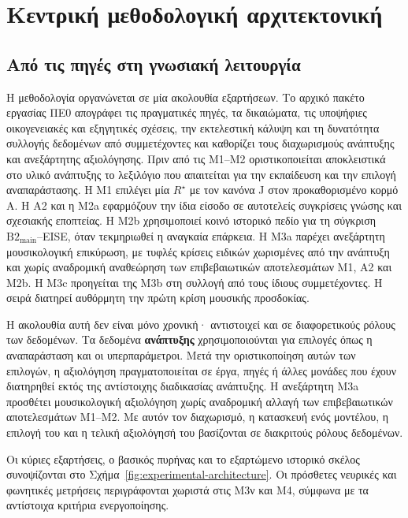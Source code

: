 \documentclass[11pt,a4paper]{article}
\begin{document}
\section{Κεντρική μεθοδολογική αρχιτεκτονική}

\subsection{Από τις πηγές στη γνωσιακή λειτουργία}

Η μεθοδολογία οργανώνεται σε μία ακολουθία εξαρτήσεων. Το αρχικό πακέτο εργασίας ΠΕ0 απογράφει τις πραγματικές πηγές, τα δικαιώματα, τις υποψήφιες οικογενειακές και εξηγητικές σχέσεις, την εκτελεστική κάλυψη και τη δυνατότητα συλλογής δεδομένων από συμμετέχοντες και καθορίζει τους διαχωρισμούς ανάπτυξης και ανεξάρτητης αξιολόγησης. Πριν από τις M1--M2 οριστικοποιείται αποκλειστικά στο υλικό ανάπτυξης το λεξιλόγιο που απαιτείται για την εκπαίδευση και την επιλογή αναπαράστασης. Η Μ1 επιλέγει μία $R^\star$ με τον κανόνα J στον προκαθορισμένο κορμό A. Η Α2 και η Μ2a εφαρμόζουν την ίδια είσοδο σε αυτοτελείς συγκρίσεις γνώσης και σχεσιακής εποπτείας. Η Μ2b χρησιμοποιεί κοινό ιστορικό πεδίο για τη σύγκριση $\mathrm{B2}_{\mathrm{main}}$--EISE, όταν τεκμηριωθεί η αναγκαία επάρκεια. Η M3a παρέχει ανεξάρτητη μουσικολογική επικύρωση, με τυφλές κρίσεις ειδικών χωρισμένες από την ανάπτυξη και χωρίς αναδρομική αναθεώρηση των επιβεβαιωτικών αποτελεσμάτων M1, Α2 και Μ2b. Η M3c προηγείται της M3b στη συλλογή από τους ίδιους συμμετέχοντες. Η σειρά διατηρεί αυθόρμητη την πρώτη κρίση μουσικής προσδοκίας.

Η ακολουθία αυτή δεν είναι μόνο χρονική· αντιστοιχεί και σε διαφορετικούς ρόλους των δεδομένων. Τα δεδομένα \textbf{ανάπτυξης} χρησιμοποιούνται για επιλογές όπως η αναπαράσταση και οι υπερπαράμετροι. Μετά την οριστικοποίηση αυτών των επιλογών, η αξιολόγηση πραγματοποιείται σε έργα, πηγές ή άλλες μονάδες που έχουν διατηρηθεί εκτός της αντίστοιχης διαδικασίας ανάπτυξης. Η ανεξάρτητη M3a προσθέτει μουσικολογική αξιολόγηση χωρίς αναδρομική αλλαγή των επιβεβαιωτικών αποτελεσμάτων M1--M2. Με αυτόν τον διαχωρισμό, η κατασκευή ενός μοντέλου, η επιλογή του και η τελική αξιολόγησή του βασίζονται σε διακριτούς ρόλους δεδομένων.

Οι κύριες εξαρτήσεις, ο βασικός πυρήνας και το εξαρτώμενο ιστορικό σκέλος συνοψίζονται στο Σχήμα~\ref{fig:experimental-architecture}. Οι πρόσθετες νευρικές και φωνητικές μετρήσεις περιγράφονται χωριστά στις M3ν και M4, σύμφωνα με τα αντίστοιχα κριτήρια ενεργοποίησης.
\end{document}

